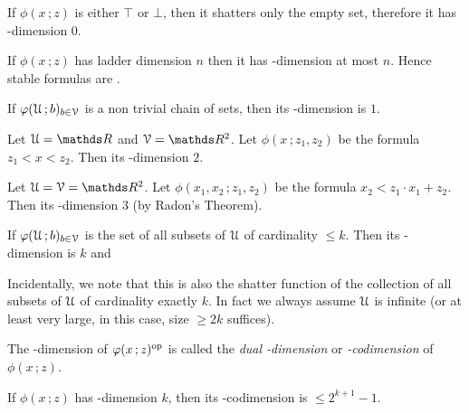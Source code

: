 \documentclass[scombinatorics.tex]{subfiles}
\begin{document}
\begin{example}
  If $\phi(x\,;z)$ is either $\top$ or $\bot$, then it shatters only the empty set, therefore it has \vc-dimension $0$.\QED
\end{example}

\begin{example}
  If $\phi(x\,;z)$ has ladder dimension $n$ then it has \vc-dimension at most $n$. Hence stable formulas are \nip.\QED
\end{example}
 
\begin{example}
  If $\phi(\U\,;b)_{b\in\V}$ is a non trivial chain of sets, then its \vc-dimension is $1$.\QED
\end{example}
 
\begin{example} 
  Let $\U=\RR$ and $\V=\RR^2$.
  Let $\phi(x\,;z_1,z_2)$ be the formula $z_1<x<z_2$.
  Then its \vc-dimension $2$.\QED
\end{example}
 
\begin{example} 
  Let $\U=\V=\RR^2$.
  Let $\phi(x_1,x_2\,;z_1,z_2)$ be the formula $x_2<z_1\cdot x_1 + z_2$.
  Then its  \vc-dimension $3$ (by Radon's Theorem).\QED
\end{example}
 
\begin{example}\label{ex_vcdim_opt}
  If $\phi(\U\,;b)_{b\in\V}$ is the set of all subsets of $\U$ of cardinality $\le k$.
  Then its \vc-dimension is $k$ and
  
  
  Incidentally, we note that this is also the shatter function of the collection of all subsets of $\U$ of cardinality exactly $k$.
  In fact we always assume $\U$ is infinite (or at least very large, in this case, size $\ge2k$ suffices).\QED
\end{example}

The \vc-dimension of $\phi(x\,;z)^{\rm op}$ is called the \emph{dual \vc-dimension\/} or \emph{\vc-codimension\/} of $\phi(x\,;z)$.

\begin{proposition}\label{prop_bound_VCcodim}
  If $\phi(x\,;z)$ has \vc-dimension $k$, then its \vc-codimension is $\le2^{k+1}-1$.
\end{proposition}
  
\end{document}
